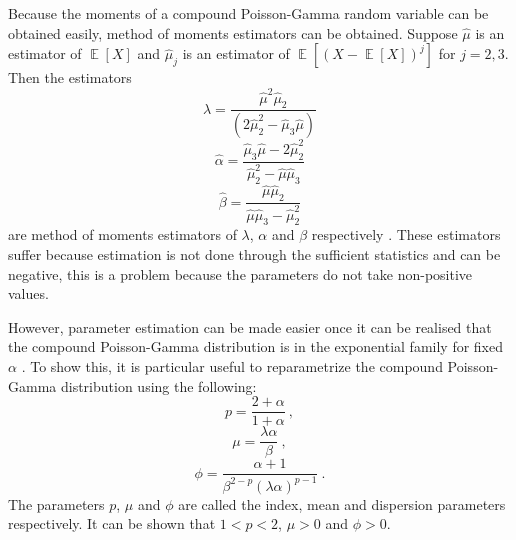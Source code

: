 \documentclass[12pt, a4paper]{memoir}
\DeclareMathOperator{\expectation}{\mathbb{E}}
\begin{document}
Because the moments of a compound Poisson-Gamma random variable can be obtained easily, method of moments estimators can be obtained. Suppose $\widehat{\mu}$ is an estimator of $\expectation[X]$ and $\widehat{\mu}_j$ is an estimator of $\expectation\left[\left(X-\expectation[X]\right)^j\right]$ for $j=2,3$. Then the estimators
\begin{equation}
\widehat{\lambda}=\frac{\widehat{\mu}^2\widehat{\mu}_2}{\left(2\widehat{\mu}_2^2-\widehat{\mu}_3\widehat{\mu}\right)}
\end{equation}
\begin{equation}
\widehat{\alpha}=\frac{\widehat{\mu}_3\widehat{\mu}-2\widehat{\mu}_2^2}{\widehat{\mu}_2^2-\widehat{\mu}\widehat{\mu}_3}
\end{equation}
\begin{equation}
\widehat{\beta}=\frac{\widehat{\mu}\widehat{\mu}_2}{\widehat{\mu}\widehat{\mu}_3-\widehat{\mu}_2^2}
\end{equation}
are method of moments estimators of $\lambda$, $\alpha$ and $\beta$ respectively \citep{withers2011compound}. These estimators suffer because estimation is not done through the sufficient statistics and can be negative, this is a problem because the parameters do not take non-positive values.

However, parameter estimation can be made easier once it can be realised that the compound Poisson-Gamma distribution is in the exponential family for fixed $\alpha$ \citep{jorgensen1987exponential}. To show this, it is particular useful to reparametrize the compound Poisson-Gamma distribution using the following:
\begin{equation}
p=\frac{2+\alpha}{1+\alpha} \ ,
\end{equation}
\begin{equation}
\mu=\frac{\lambda\alpha}{\beta} \ ,
\end{equation}
\begin{equation}
\phi = \frac{\alpha+1}{\beta^{2-p}(\lambda\alpha)^{p-1}} \ .
\end{equation}
The parameters $p$, $\mu$ and $\phi$ are called the index, mean and dispersion parameters respectively. It can be shown that $1<p<2$, $\mu>0$ and $\phi>0$.
\end{document}
